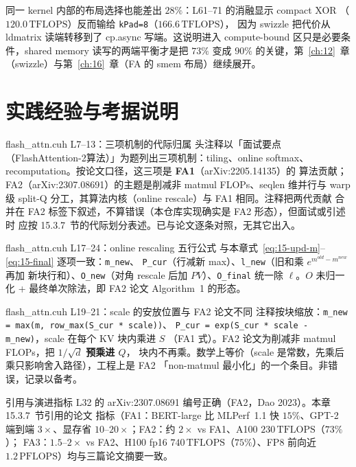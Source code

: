 同一 kernel 内部的布局选择也能差出 $28\%$：L61--71 的消融显示 compact XOR
（$120.0\,\mathrm{TFLOPS}$）反而输给 \texttt{kPad=8}（$166.6\,\mathrm{TFLOPS}$），
因为 swizzle 把代价从 ldmatrix 读端转移到了 cp.async 写端。这说明进入 compute-bound
区只是必要条件，shared memory 读写的两端平衡才是把 $73\%$
变成 $90\%$ 的关键，第~\ref{ch:12}~章（swizzle）与第~\ref{ch:16}~章（FA 的
smem 布局）继续展开。

\section{实践经验与考据说明}

\begin{kaogu}[F5]{flash\_attn.cuh L7--13：三项机制的代际归属}
  头注释以「面试要点（FlashAttention-2算法）」为题列出三项机制：tiling、online
  softmax、recomputation。按论文口径，这三项是 \textbf{FA1}（arXiv:2205.14135）的
  算法贡献；FA2（arXiv:2307.08691）的主题是削减非 matmul FLOPs、seqlen 维并行与
  warp 级 split-Q 分工，其算法内核（online rescale）与 FA1 相同。注释把两代贡献
  合并在 FA2 标签下叙述，不算错误（本仓库实现确实是 FA2 形态），但面试或引述时
  应按 15.3.7~节的代际划分表述。已与论文逐条对照，无其它出入。
\end{kaogu}

\begin{kaogu}[F3 核校通过]{flash\_attn.cuh L17--24：online rescaling 五行公式}
  与本章式~\ref{eq:15-upd-m}--\ref{eq:15-final} 逐项一致：\texttt{m\_new}、
  \texttt{P\_cur}（行减新 max）、\texttt{l\_new}（旧和乘 $e^{m^{old}-m^{new}}$ 再加
  新块行和）、\texttt{O\_new}（对角 rescale 后加 $PV$）、\texttt{O\_final} 统一除
  $\ell$。$O$ 未归一化 + 最终单次除法，即 FA2 论文 Algorithm~1 的形态。
\end{kaogu}

\begin{kaogu}[F5]{flash\_attn.cuh L19--21：scale 的安放位置与 FA2 论文不同}
  注释按块缩放：\texttt{m\_\allowbreak{}new =\allowbreak{} max\allowbreak{}(m,\allowbreak{} row\_\allowbreak{}max\allowbreak{}(S\_\allowbreak{}cur * scale))}、
  \texttt{P\_cur = exp(S\_cur * scale - m\_new)}，scale 在每个 KV 块内乘进 $S$
  （FA1 式）。FA2 论文为削减非 matmul FLOPs，把 $1/\sqrt{d}$ \textbf{预乘进 $Q$}，
  块内不再乘。数学上等价（scale 是常数，先乘后乘只影响舍入路径），工程上是 FA2
  「non-matmul 最小化」的一个条目。非错误，记录以备考。
\end{kaogu}

\begin{kaogu}[F5 核校通过]{引用与演进指标}
  L32 的 arXiv:2307.08691 编号正确（FA2，Dao 2023）。本章 15.3.7~节引用的论文
  指标（FA1：BERT-large 比 MLPerf~1.1 快 $15\%$、GPT-2 端到端 $3\times$、显存省
  $10$--$20\times$；FA2：约 $2\times$ vs FA1、A100 $230\,\mathrm{TFLOPS}$（$73\%$）；
  FA3：$1.5$--$2\times$ vs FA2、H100 fp16 $740\,\mathrm{TFLOPS}$（$75\%$）、FP8
  前向近 $1.2\,\mathrm{PFLOPS}$）均与三篇论文摘要一致。
\end{kaogu}

